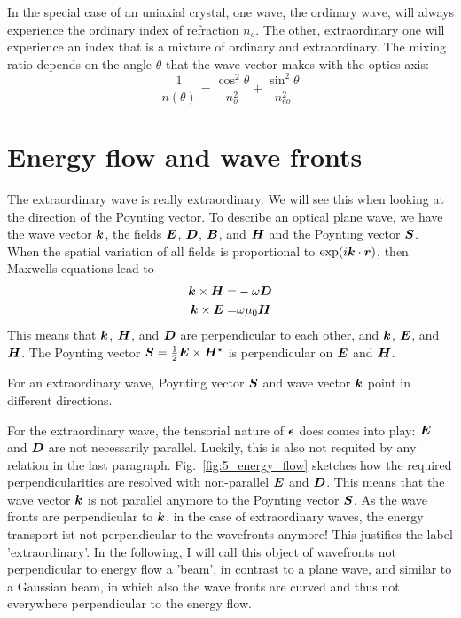 In the special case of an uniaxial crystal, one wave, the ordinary wave, will always experience the ordinary index of refraction $n_o$. The other, extraordinary  one will experience an index that is a mixture of ordinary and extraordinary. The mixing ratio depends on the angle $\theta$ that the wave vector makes with the optics axis:
\begin{equation}
    \frac{1}{n(\theta)} = \frac{\cos^2 \theta}{n_o^2} + \frac{\sin^2 \theta}{n_{eo}^2}
\end{equation}



\section{Energy flow and wave fronts}

The extraordinary wave is really extraordinary. We will see this when looking at the direction of the Poynting vector. To describe an optical plane wave, we have the wave vector $\boldsymbol{k}$, the fields $\boldsymbol{E}$, $\boldsymbol{D}$, $\boldsymbol{B}$, and $\boldsymbol{H}$ and the Poynting vector $\boldsymbol{S}$. When the spatial variation of all fields is proportional to $\exp(i \boldsymbol{k} \cdot \boldsymbol{r})$, then Maxwells equations lead to
\begin{align}
    \boldsymbol{k} \times \boldsymbol{H} = & - \omega \boldsymbol{D}  \label{eq:6_kHD}\\
    \boldsymbol{k} \times \boldsymbol{E} = &  \omega \mu_0 \boldsymbol{H}     \label{eq:6_kEH}
\end{align}
This means that $\boldsymbol{k}$, $\boldsymbol{H}$, and  $\boldsymbol{D}$ are perpendicular to each other, and  $\boldsymbol{k}$, $\boldsymbol{E}$, and $\boldsymbol{H}$. The Poynting vector $\boldsymbol{S} = \frac{1}{2} \boldsymbol{E} \times \boldsymbol{H}^\star$ is perpendicular on $\boldsymbol{E}$ and $\boldsymbol{H}$.

\begin{marginfigure}
    \caption{For an extraordinary wave, Poynting vector $\boldsymbol{S}$ and wave vector $\boldsymbol{k}$ point in different directions.
    \label{fig:5_energy_flow}}
\end{marginfigure}

For the extraordinary wave, the tensorial nature of $\boldsymbol{\epsilon}$ does  comes into play: $\boldsymbol{E}$ and $\boldsymbol{D}$ are not necessarily parallel. Luckily, this is also not  requited by any relation in the last paragraph. Fig.~\ref{fig:5_energy_flow} sketches how the required perpendicularities are resolved with non-parallel  $\boldsymbol{E}$ and $\boldsymbol{D}$. This means that the wave vector $\boldsymbol{k}$ is not parallel anymore to the Poynting vector $\boldsymbol{S}$. As the wave fronts are perpendicular to $\boldsymbol{k}$, in the case of extraordinary waves, the energy transport ist not perpendicular to the wavefronts anymore! This justifies the label 'extraordinary'. In the following, I will call this object of wavefronts not perpendicular to energy flow a 'beam', in contrast to a plane wave, and similar to a Gaussian beam, in which also the wave fronts are curved and thus not everywhere perpendicular to the energy flow.

